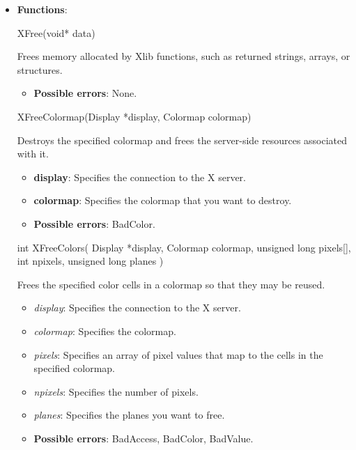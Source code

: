 \documentclass{report}
\begin{document}
    \begin{itemize}
        \item \textbf{Functions}:
            \begin{cppcode}
                XFree(void* data)
            \end{cppcode}
            \bigbreak \noindent 
            Frees memory allocated by Xlib functions, such as returned strings, arrays, or structures.

            \begin{itemize}
                \item \textbf{Possible errors}: None.
            \end{itemize}

            \begin{cppcode}
                XFreeColormap(Display *display, Colormap colormap)
            \end{cppcode}
            \bigbreak \noindent 
            Destroys the specified colormap and frees the server-side resources associated with it.
            \begin{itemize}
                \item \textbf{display}: Specifies the connection to the X server.
                \item \textbf{colormap}: Specifies the colormap that you want to destroy.
            \end{itemize}
            \begin{itemize}
                \item \textbf{Possible errors}: BadColor.
            \end{itemize}

            \begin{cppcode}
                int XFreeColors(
                    Display *display,
                    Colormap colormap,
                    unsigned long pixels[],
                    int npixels,
                    unsigned long planes
                )
            \end{cppcode}
            \bigbreak \noindent 
            Frees the specified color cells in a colormap so that they may be reused.
            \begin{itemize}
                \item \textit{display}: Specifies the connection to the X server.
                \item \textit{colormap}: Specifies the colormap.
                \item \textit{pixels}: Specifies an array of pixel values that map to the cells in the specified colormap.
                \item \textit{npixels}: Specifies the number of pixels.
                \item \textit{planes}: Specifies the planes you want to free.
            \end{itemize}
            \begin{itemize}
                \item \textbf{Possible errors}: BadAccess, BadColor, BadValue.
            \end{itemize}


\end{itemize}
\end{document}
